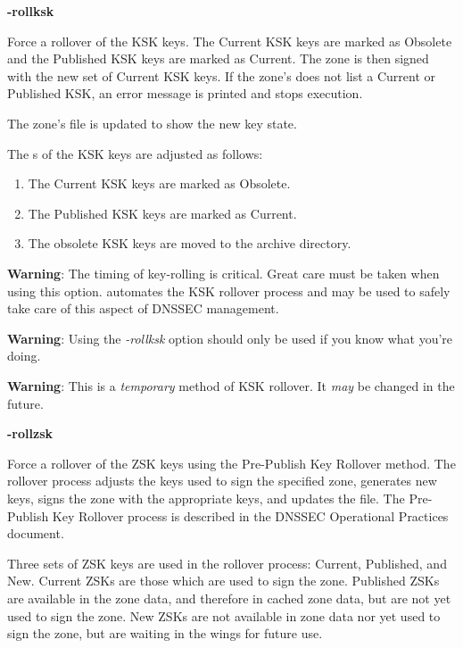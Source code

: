 \begin{description}
\item {\bf -rollksk}\verb" "

Force a rollover of the KSK keys.  The Current KSK keys are marked as Obsolete
and the Published KSK keys are marked as Current.  The zone is then signed
with the new set of Current KSK keys.  If the zone's  does not
list a Current or Published KSK, an error message is printed and
 stops execution.

The zone's  file is updated to show the new key state.

The s of the KSK keys are adjusted as follows:

\begin{enumerate}
\item The Current KSK keys are marked as Obsolete.
\item The Published KSK keys are marked as Current.
\item The obsolete KSK keys are moved to the archive directory.
\end{enumerate}

{\bf Warning}:  The timing of key-rolling is critical.  Great care must be
taken when using this option.   automates the KSK rollover
process and may be used to safely take care of this aspect of DNSSEC
management.

{\bf Warning}:  Using the {\it -rollksk} option should only be used if you
know what you're doing.

{\bf Warning}:  This is a {\it temporary} method of KSK rollover.  It {\it
may} be changed in the future.

\item {\bf -rollzsk}\verb" "

Force a rollover of the ZSK keys using the Pre-Publish Key Rollover method.
The rollover process adjusts the keys used to sign the specified zone,
generates new keys, signs the zone with the appropriate keys, and updates the
 file.  The Pre-Publish Key Rollover process is described in the
DNSSEC Operational Practices document.

Three sets of ZSK keys are used in the rollover process:  Current, Published,
and New.  Current ZSKs are those which are used to sign the zone.  Published
ZSKs are available in the zone data, and therefore in cached zone data, but
are not yet used to sign the zone.  New ZSKs are not available in zone data
nor yet used to sign the zone, but are waiting in the wings for future use.


\end{description}
